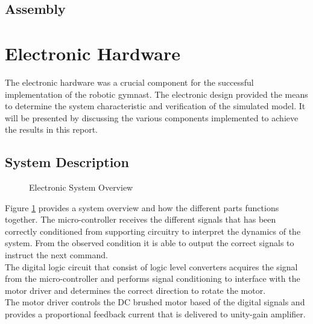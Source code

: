 \subsection{Assembly}



\section{Electronic Hardware}
The electronic hardware was a crucial component for the successful implementation of the robotic gymnast. The electronic design provided the means to determine the system characteristic and verification of the simulated model. It will be presented by discussing the various components implemented to achieve the results in this report.

\subsection{System Description}

\begin{figure}[h]
	\centering
	
	\caption{Electronic System Overview}
	\label{fig:electronicSystemOverview}
\end{figure}



Figure \ref{fig:electronicSystemOverview} provides a system overview and how the different parts functions together. The micro-controller receives the different signals that has been correctly conditioned from supporting circuitry to interpret the dynamics of the system. From the observed condition it is able to output the correct signals to instruct the next command.\\

The digital logic circuit that consist of logic level converters acquires the signal from the micro-controller and performs signal conditioning to interface with the motor driver and determines the correct direction to rotate the motor. \\

The motor driver controls the DC brushed motor based of the digital signals and provides a proportional feedback current that is delivered to unity-gain amplifier.\\

